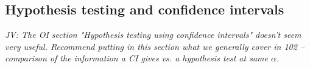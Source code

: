 \begin{spacing}{1.5}

\subsection{Hypothesis testing and confidence intervals}

\textit{JV: The OI section "Hypothesis testing using confidence intervals" doesn't seem very useful. Recommend putting in this section what we generally cover in 102 -- comparison of the information a CI gives vs. a hypothesis test at same $\alpha$.}


\end{spacing}
